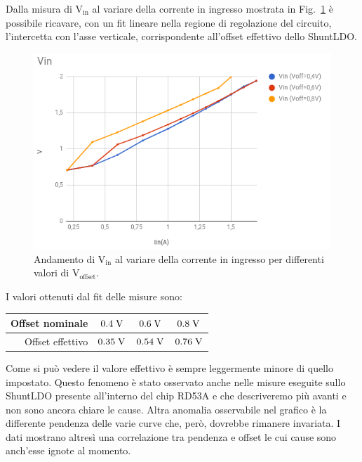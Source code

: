 Dalla misura di $\mathrm{V_{in}}$ al variare della corrente in ingresso mostrata in Fig.~\ref{VinVsVoffset} è possibile ricavare, con un fit lineare nella regione di regolazione del circuito, l'intercetta con l'asse verticale, corrispondente all'offset effettivo dello ShuntLDO. 
\begin{figure}
\centering
\includegraphics[scale=.4]{Immagini/VinVsVoffset}
\caption{Andamento di $\mathrm{V_{in}}$ al variare della corrente in ingresso per differenti valori di $\mathrm{V_{offset}}$.}
\label{VinVsVoffset}
\end{figure}

I valori ottenuti dal fit delle misure sono:

\begin{center}
\begin{tabular}{rccc}
\hline
Offset nominale & $0.4\rm \; V$ & $0.6\rm \; V$ & $0.8\rm \; V$\\
\hline
Offset effettivo & $0.35\rm \; V$ & $0.54\rm \; V$ & $0.76\rm \; V$\\
\hline
\end{tabular}
\end{center}
%
%
%
%

Come si può vedere il valore effettivo è sempre leggermente minore di quello impostato. Questo fenomeno è stato osservato anche nelle misure eseguite sullo ShuntLDO presente all'interno del chip RD53A e che descriveremo più avanti e non sono ancora chiare le cause. Altra anomalia osservabile nel grafico \`e la differente pendenza delle varie curve che, per\`o, dovrebbe rimanere invariata. I dati mostrano altres\`i una correlazione tra pendenza e offset le cui cause sono anch'esse ignote al momento. 
\FloatBarrier


